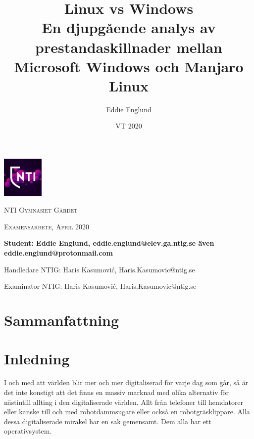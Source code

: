 \documentclass[12pt, a4paper]{report}
\author{Eddie Englund}
\title{Linux vs Windows\\[0.2em]\smaller{}En djupgående analys av prestandaskillnader mellan Microsoft Windows och Manjaro Linux}
\date{VT 2020}
\begin{document}
\begin{titlepage}
    \maketitle

    \begin{center}
        \thispagestyle{empty}
    
        \includegraphics[width=0.15\textwidth]{nti}\par\vspace{1cm}

    {\scshape\LARGE NTI Gymnasiet Gärdet \par}
    \vspace{1cm}
    {\scshape\Large Examensarbete, April 2020\par}
	\vspace{1.5cm}
    \textbf{
    Student: Eddie Englund, eddie.englund@elev.ga.ntig.se även eddie.englund@protonmail.com}
    \vspace{0.2cm}

    Handledare NTIG: Haris Kasumović, Haris.Kasumovic@ntig.se
    \vspace{0.1cm}

    Examinator NTIG: Haris Kasumović, Haris.Kasumovic@ntig.se
    
    \end{center}
\end{titlepage}


\section{Sammanfattning}\label{sum}

    \begin{abstract}

    \end{abstract}

\tableofcontents

\vspace{3cm}

    
\section{Inledning}
 
 
   I och med att världen blir mer och mer digitaliserad för varje dag som går, så är det inte konstigt att det finns en massiv marknad med olika alternativ för nästintill allting i den digitaliserade världen. Allt från telefoner till hemdatorer eller kanske till och med robotdammsugare eller också en robotgräsklippare. Alla dessa digitaliserade mirakel har en sak gemensamt. Dem alla har ett operativsystem.
 
\end{document}

